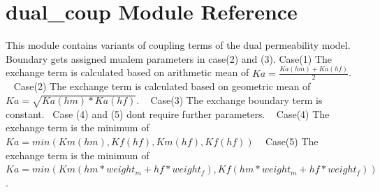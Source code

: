 \section{dual\+\_\+coup Module Reference}
\label{namespacedual__coup}


This module contains variants of coupling terms of the dual permeability model. Boundary gets assigned mualem parameters in case(2) and (3). Case(1) The exchange term is calculated based on arithmetic mean of $Ka=\frac{Ka(hm)+Ka(hf)}{2}$. ~\newline
 Case(2) The exchange term is calculated based on geometric mean of $Ka=\sqrt{Ka(hm)*Ka(hf)}$. ~\newline
 Case(3) The exchange boundary term is constant.~\newline
 Case (4) and (5) don\textquotesingle{}t require further parameters. ~\newline
 Case(4) The exchange term is the minimum of $Ka=min(Km(hm),Kf(hf),Km(hf),Kf(hf))$ ~\newline
 Case(5) The exchange term is the minimum of $Ka=min(Km(hm*weight_m+hf*weight_f),Kf(hm*weight_m+hf*weight_f))$.  


